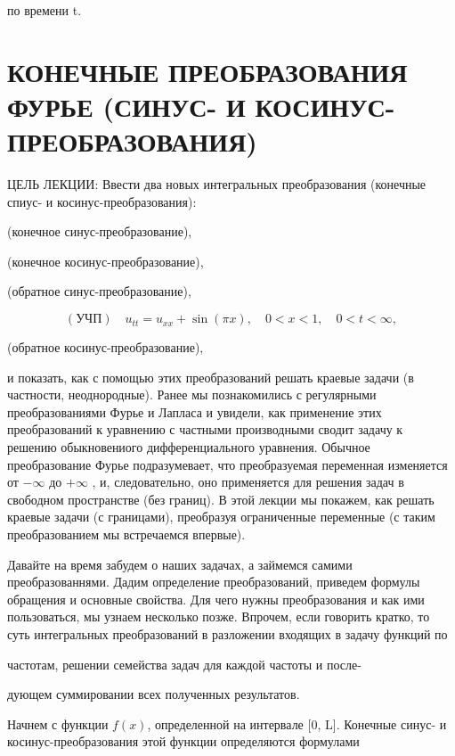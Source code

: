 \documentclass[
  ukrainian,
]{article}
\begin{document}
по времени t.

\section{КОНЕЧНЫЕ ПРЕОБРАЗОВАНИЯ ФУРЬЕ (СИНУС- И
КОСИНУС-ПРЕОБРАЗОВАНИЯ)}\label{ux43aux43eux43dux435ux447ux43dux44bux435-ux43fux440ux435ux43eux431ux440ux430ux437ux43eux432ux430ux43dux438ux44f-ux444ux443ux440ux44cux435-ux441ux438ux43dux443ux441--ux438-ux43aux43eux441ux438ux43dux443ux441-ux43fux440ux435ux43eux431ux440ux430ux437ux43eux432ux430ux43dux438ux44f}

ЦЕЛЬ ЛЕКЦИИ: Ввести два новых интегральных преобразования (конечные
спиус- и косинус-преобразования):

(конечное синус-преобразование),

(конечное косинус-преобразование),

(обратное синус-преобразование),

\[
(\text{УЧП}) \quad u_{tt} = u_{xx} + \sin(\pi x), \quad 0 < x < 1, \quad 0 < t < \infty,
\]

(обратное косинус-преобразование),

и показать, как с помощью этих преобразований решать краевые задачи (в
частности, неоднородные). Ранее мы познакомились с регулярными
преобразованиями Фурье и Лапласа и увидели, как применение этих
преобразований к уравнению с частными производными сводит задачу к
решению обыкновениого дифференциального уравнения. Обычное
преобразование Фурье подразумевает, что преобразуемая переменная
изменяется от \(-\infty\) до \(+\infty\) , и, следовательно, оно
применяется для решения задач в свободном пространстве (без границ). В
этой лекции мы покажем, как решать краевые задачи (с границами),
преобразуя ограниченные переменные (с таким преобразованием мы
встречаемся впервые).

Давайте на время забудем о наших задачах, а займемся самими
преобразованнями. Дадим определение преобразований, приведем формулы
обращения и основные свойства. Для чего нужны преобразования и как ими
пользоваться, мы узнаем несколько позже. Впрочем, если говорить кратко,
то суть интегральных преобразований в разложении входящих в задачу
функций по

частотам, решении семейства задач для каждой частоты и после-

дующем суммировании всех полученных результатов.

Начнем с функции \(f(x)\), определенной на интервале {[}0, L{]}.
Конечные синус- и косинус-преобразования этой функции определяются
формулами
\end{document}
